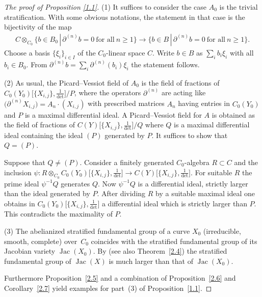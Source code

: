 \documentclass[pdftex]{sigma}
\numberwithin{equation}{section}
\begin{document}
\begin{proof}[The proof of Proposition \ref{1.1}]
(1) It suffices to consider the case $A_0$ is the trivial stratification. With some obvious notations,
 the statement in that case is the bijectivity of the map
\begin{gather*}
C\otimes_{C_0}\big\{b\in B_0\,|\, \partial ^{(n)}b=0 \ \text{for all} \ n\geq 1\big\}\rightarrow \big\{ b\in B \,|\, \partial^{(n)}b=0
\ \text{for all} \ n\geq 1\big\}.
\end{gather*}
Choose a basis $\{\xi_i\}_{i\in I}$ of the $C_0$-linear space $C$. Write $b\in B$ as $\sum _ib_i\xi_i$ with all $b_i\in B_0$. From $\partial^{(n)}b=\sum _i \partial^{(n)}(b_i)\xi_i$ the statement follows.

(2) As usual, the Picard--Vessiot field of $A_0$ is the field of fractions of $C_0(Y_0)\big[\{X_{i,j}\},\frac{1}{\det}\big]/P$, where the operators $\partial ^{(n)}$ are acting like $\big(\partial ^{(n)}X_{i,j}\big)=A_n\cdot (X_{i,j})$ with prescribed matrices $A_n$ having entries in $C_0(Y_0)$ and $P$ is a maximal differential ideal. A Picard--Vessiot field for $A$ is obtained as the field of fractions of $C(Y)\big[\{X_{i,j}\},\frac{1}{\det}\big]/Q$ where $Q$ is a maximal differential ideal containing the ideal $(P)$ generated
 by $P$. It suffices to show that $Q=(P)$.

Suppose that $Q\neq (P)$. Consider a finitely generated $C_0$-algebra $R\subset C$ and the inclusion $\psi\colon R\otimes _{C_0}C_0(Y_0)\big[\{X_{i,j}\}, \frac{1}{\det}\big]\rightarrow C(Y)\big[\{X_{i,j}\},\frac{1}{\det}\big]$. For suitable $R$ the prime ideal $\psi^{-1}Q$ gene\-ra\-tes $Q$. Now $\psi^{-1}Q$ is a differential ideal, strictly larger than the ideal generated by $P$. After dividing $R$ by a suitable maximal ideal one obtains in $C_0(Y_0)\big[\{X_{i,j}\},\frac{1}{\det}\big]$ a differential ideal which is strictly larger than $P$. This contradicts the maximality of $P$.

(3) The abelianized stratified fundamental group of a curve $X_0$ (irreducible, smooth, complete) over~$C_0$ coincides with the stratified fundamental group of its Jacobian variety $\operatorname{Jac}(X_0)$. By \cite[Theorem~21]{Sa} (see also Theorem~\ref{2.4}) the stratified fundamental group of $\operatorname{Jac}(X)$ is much larger than that of $\operatorname{Jac}(X_0)$.

Furthermore Proposition~\ref{2.5} and a combination of Proposition~\ref{2.6} and Corollary~\ref{2.7} yield examples for part~(3) of Proposition~\ref{1.1}.
\end{proof}
\end{document}
